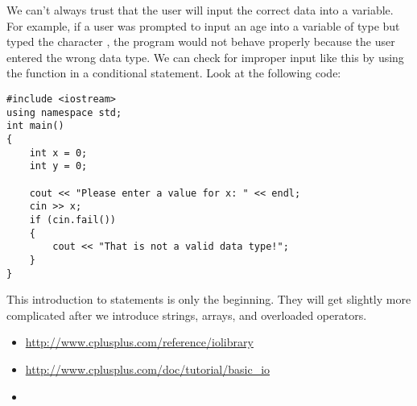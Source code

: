 We can't always trust that the user will input the correct data into a variable. 
For example, if a user was prompted to input an age into a variable of type  but typed the character , the program would not behave properly because the user entered the wrong data type. 
We can check for improper input like this by using the  function in a conditional statement.
Look at the following code:

\begin{lstlisting}
#include <iostream>
using namespace std;
int main()
{
	int x = 0;
	int y = 0;
	
	cout << "Please enter a value for x: " << endl;
	cin >> x;
	if (cin.fail())
	{
		cout << "That is not a valid data type!";
	}
}
\end{lstlisting}

This introduction to  statements is only the beginning. 
They will get slightly more complicated after we introduce strings, arrays, and overloaded operators.






\begin{itemize}
\item \url{http://www.cplusplus.com/reference/iolibrary}
\item \url{http://www.cplusplus.com/doc/tutorial/basic_io}
\item ~
\end{itemize}	

